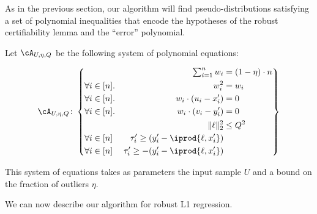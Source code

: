 As in the previous section, our algorithm will find pseudo-distributions satisfying a set of polynomial inequalities that encode the hypotheses of the robust certifiability lemma and the ``error'' polynomial. 

Let $\cA_{U,\eta,Q}$ be the following system of polynomial equations:

\begin{equation}
  \cA_{U,\eta,Q}\colon
  \left \{
    \begin{aligned}
      &&
      \textstyle\sum_{i=1}^n w_i
      &= (1-\eta) \cdot n\\
      &\forall i\in [n].
      & w_i^2
      & =w_i \\
      &\forall i\in [n].
      & w_i \cdot (u_i - x'_i)
      & = 0\\
      &\forall i\in [n].
      & w_i \cdot (v_i - y'_i)
      & = 0\\
      & &\|\ell\|_2^2 &\leq Q^2\\
      &\forall i \in [n] & \tau_i' \geq (y_i' - \iprod{\ell,x'_i})\\
      &\forall i \in [n] & \tau_i' \geq -(y_i' - \iprod{\ell,x'_i})
    \end{aligned}
  \right \} \label{eq:polynomial-constraints-w}
\end{equation}

This system of equations takes as parameters the input sample $U$ and a bound on the fraction of outliers $\eta$. 

We can now describe our algorithm for robust L1 regression. 

